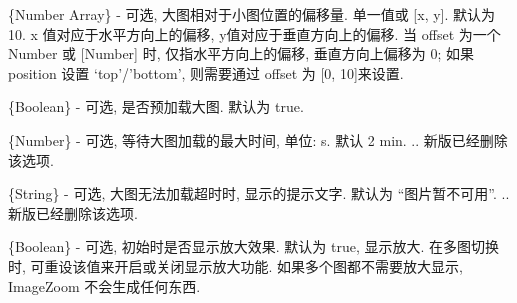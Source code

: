 \documentclass[letterpaper,10pt,english]{sphinxmanual}
\begin{document}
\begin{fulllineitems}
\label{api/component/imagezoom/index:ImageZoom.offset}
\{Number \textbar{} Array\} - 可选, 大图相对于小图位置的偏移量. 单一值或 {[}x, y{]}. 默认为 10. x 值对应于水平方向上的偏移, y值对应于垂直方向上的偏移. 当 offset 为一个 Number 或 {[}Number{]} 时, 仅指水平方向上的偏移, 垂直方向上偏移为 0; 如果 position 设置 `top'/'bottom', 则需要通过 offset 为 {[}0, 10{]}来设置.

\end{fulllineitems}



\begin{fulllineitems}
\label{api/component/imagezoom/index:ImageZoom.preload}
\{Boolean\} - 可选, 是否预加载大图. 默认为 true.

\end{fulllineitems}



\begin{fulllineitems}
\label{api/component/imagezoom/index:ImageZoom.timeout}
\{Number\} - 可选, 等待大图加载的最大时间, 单位: s. 默认 2 min.
.. 新版已经删除该选项.

\end{fulllineitems}



\begin{fulllineitems}
\label{api/component/imagezoom/index:ImageZoom.timeoutMsg}
\{String\} - 可选, 大图无法加载超时时, 显示的提示文字. 默认为 ``图片暂不可用''.
.. 新版已经删除该选项.

\end{fulllineitems}



\begin{fulllineitems}
\label{api/component/imagezoom/index:ImageZoom.hasZoom}
\{Boolean\} - 可选, 初始时是否显示放大效果. 默认为 true, 显示放大. 在多图切换时, 可重设该值来开启或关闭显示放大功能. 如果多个图都不需要放大显示, ImageZoom 不会生成任何东西.

\end{fulllineitems}
\end{document}

